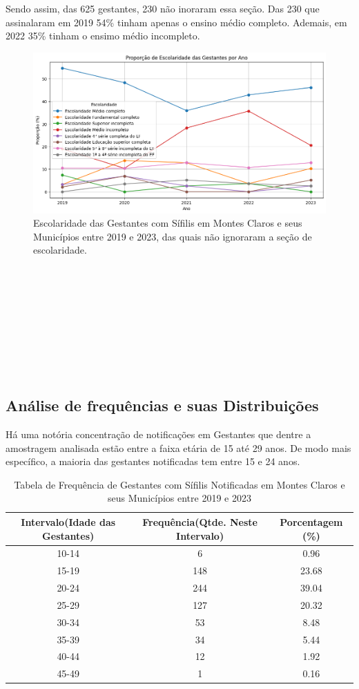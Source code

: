 \documentclass[a4paper]{article}
\begin{document}
\begin{multicols}
Sendo assim, das 625 gestantes, 230 não inoraram essa seção. Das 230 que assinalaram em 2019 54\% tinham apenas o ensino médio completo. Ademais, em 2022 35\% tinham o ensimo médio incompleto.
\begin{figure}[h!]
    \centering
    \includegraphics[width=0.7\linewidth]{imagens/EscolaridadeNãoIgnorada.png}
    \caption{Escolaridade das Gestantes com Sífilis em Montes Claros e seus Municípios entre 2019 e 2023, das quais não ignoraram a seção de escolaridade.}
    \label{fig:enter-label}
\end{figure}
\\
\\
\\
\\
\\
\\
\\
\\

\subsection{Análise de frequências e suas Distribuições}
Há uma notória concentração de notificações em Gestantes que dentre a amostragem analisada estão entre a faixa etária de 15 até 29 anos. De modo mais específico, a maioria das gestantes notificadas tem entre 15 e 24 anos.
\\
\begin{table}[h!]
\centering
\caption{Tabela de Frequência de Gestantes com Sífilis Notificadas em Montes Claros e seus Municípios entre 2019 e 2023}
\label{tab:frequencia_idades_intervalos}
\begin{tabular}{|c|c|c|}
\hline
Intervalo(Idade das Gestantes) & Frequência(Qtde. Neste Intervalo) & Porcentagem (\%) \\
\hline
10-14 & 6 & 0.96 \\
15-19 & 148 & 23.68 \\
20-24 & 244 & 39.04 \\
25-29 & 127 & 20.32 \\
30-34 & 53 & 8.48 \\
35-39 & 34 & 5.44 \\
40-44 & 12 & 1.92 \\
45-49 & 1 & 0.16 \\
\hline
\end{tabular}
\end{table}


\end{multicols}
\end{document}
